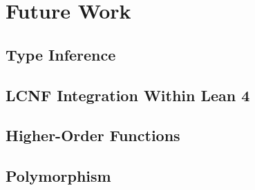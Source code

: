 \chapter{Future Work}\label{sec:futurework}

\section{Type Inference}

\section{LCNF Integration Within Lean 4}

\section{Higher-Order Functions}

\section{Polymorphism}